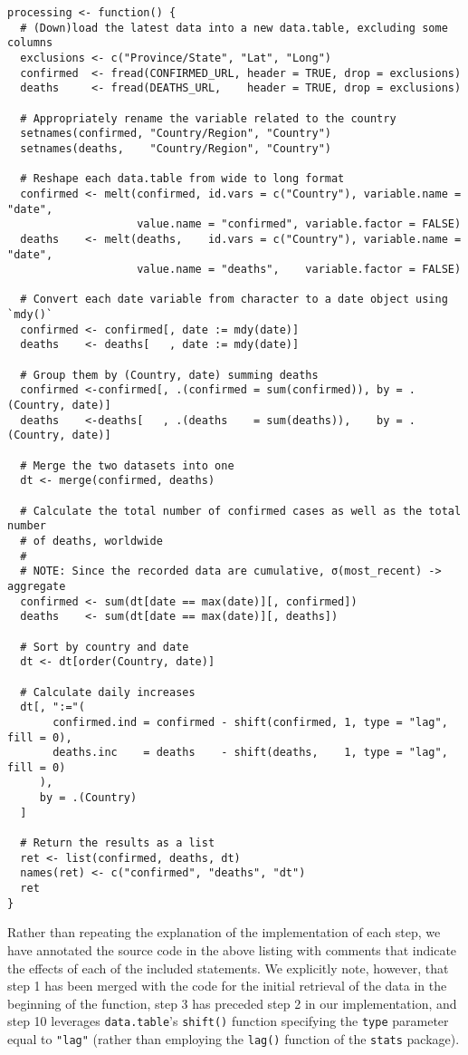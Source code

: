 \begin{verbatim}
processing <- function() {
  # (Down)load the latest data into a new data.table, excluding some columns
  exclusions <- c("Province/State", "Lat", "Long")
  confirmed  <- fread(CONFIRMED_URL, header = TRUE, drop = exclusions)
  deaths     <- fread(DEATHS_URL,    header = TRUE, drop = exclusions)

  # Appropriately rename the variable related to the country
  setnames(confirmed, "Country/Region", "Country")
  setnames(deaths,    "Country/Region", "Country")

  # Reshape each data.table from wide to long format
  confirmed <- melt(confirmed, id.vars = c("Country"), variable.name = "date",
                    value.name = "confirmed", variable.factor = FALSE)
  deaths    <- melt(deaths,    id.vars = c("Country"), variable.name = "date",
                    value.name = "deaths",    variable.factor = FALSE)

  # Convert each date variable from character to a date object using `mdy()`
  confirmed <- confirmed[, date := mdy(date)]
  deaths    <- deaths[   , date := mdy(date)]

  # Group them by (Country, date) summing deaths
  confirmed <-confirmed[, .(confirmed = sum(confirmed)), by = .(Country, date)]
  deaths    <-deaths[   , .(deaths    = sum(deaths)),    by = .(Country, date)]

  # Merge the two datasets into one
  dt <- merge(confirmed, deaths)

  # Calculate the total number of confirmed cases as well as the total number
  # of deaths, worldwide
  #
  # NOTE: Since the recorded data are cumulative, σ(most_recent) -> aggregate
  confirmed <- sum(dt[date == max(date)][, confirmed])
  deaths    <- sum(dt[date == max(date)][, deaths])

  # Sort by country and date
  dt <- dt[order(Country, date)]

  # Calculate daily increases
  dt[, ":="(
       confirmed.ind = confirmed - shift(confirmed, 1, type = "lag", fill = 0),
       deaths.inc    = deaths    - shift(deaths,    1, type = "lag", fill = 0)
     ),
     by = .(Country)
  ]

  # Return the results as a list
  ret <- list(confirmed, deaths, dt)
  names(ret) <- c("confirmed", "deaths", "dt")
  ret
}
\end{verbatim}

Rather than repeating the explanation of the implementation of each step, we have annotated the source code in the above listing with comments that indicate the effects of each of the included statements.
We explicitly note, however, that step 1 has been merged with the code for the initial retrieval of the data in the beginning of the function, step 3 has preceded step 2 in our implementation, and step 10 leverages \texttt{data.table}'s \texttt{shift()} function specifying the \texttt{type} parameter equal to \texttt{"lag"} (rather than employing the \texttt{lag()} function of the \texttt{stats} package).
